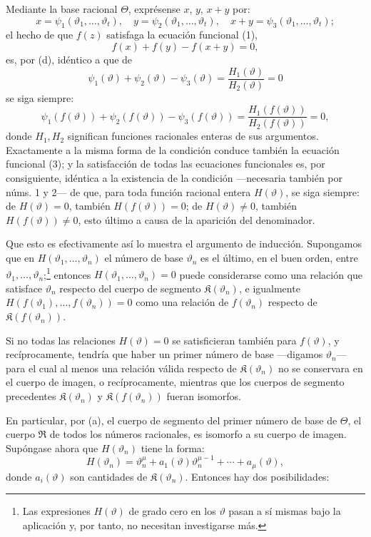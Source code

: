 \documentclass[11pt]{article}
\begin{document}
Mediante la base racional $\Theta$, exprésense $x$, $y$, $x+y$ por:
\[
x=\psi_1(\vartheta_1,\ldots,\vartheta_t),\quad
 y=\psi_2(\vartheta_1,\ldots,\vartheta_t),\quad
 x+y=\psi_3(\vartheta_1,\ldots,\vartheta_t);
\]
el hecho de que $f(z)$ satisfaga la ecuación funcional (1),
\[
f(x)+f(y)-f(x+y)=0,
\]
es, por (d), idéntico a que de
\[
\psi_1(\vartheta)+\psi_2(\vartheta)-\psi_3(\vartheta)=\frac{H_1(\vartheta)}{H_2(\vartheta)}=0
\]
se siga siempre:
\[
\psi_1(f(\vartheta))+\psi_2(f(\vartheta))-\psi_3(f(\vartheta))
=\frac{H_1(f(\vartheta))}{H_2(f(\vartheta))}=0,
\]
donde $H_1,H_2$ significan funciones racionales enteras de sus argumentos. Exactamente a la misma forma de la condición conduce también la ecuación funcional (3); y la satisfacción de todas las ecuaciones funcionales es, por consiguiente, idéntica a la existencia de la condición ---necesaria también por núms. 1 y 2--- de que, para toda función racional entera $H(\vartheta)$, se siga siempre: de $H(\vartheta)=0$, también $H(f(\vartheta))=0$; de $H(\vartheta)\ne0$, también $H(f(\vartheta))\ne0$, esto último a causa de la aparición del denominador.

Que esto es efectivamente así lo muestra el argumento de inducción. Supongamos que en $H(\vartheta_1,\ldots,\vartheta_n)$ el número de base $\vartheta_n$ es el último, en el buen orden, entre $\vartheta_1,\ldots,\vartheta_n$;\footnote{Las expresiones $H(\vartheta)$ de grado cero en los $\vartheta$ pasan a sí mismas bajo la aplicación y, por tanto, no necesitan investigarse más.} entonces $H(\vartheta_1,\ldots,\vartheta_n)=0$ puede considerarse como una relación que satisface $\vartheta_n$ respecto del cuerpo de segmento $\mathfrak K(\vartheta_n)$, e igualmente $H(f(\vartheta_1),\ldots,f(\vartheta_n))=0$ como una relación de $f(\vartheta_n)$ respecto de $\mathfrak K(f(\vartheta_n))$.

Si no todas las relaciones $H(\vartheta)=0$ se satisficieran también para $f(\vartheta)$, y recíprocamente, tendría que haber un primer número de base ---digamos $\vartheta_n$--- para el cual al menos una relación válida respecto de $\mathfrak K(\vartheta_n)$ no se conservara en el cuerpo de imagen, o recíprocamente, mientras que los cuerpos de segmento precedentes $\mathfrak K(\vartheta_n)$ y $\mathfrak K(f(\vartheta_n))$ fueran isomorfos.

En particular, por (a), el cuerpo de segmento del primer número de base de $\Theta$, el cuerpo $\mathfrak R$ de todos los números racionales, es isomorfo a su cuerpo de imagen. Supóngase ahora que $H(\vartheta_n)$ tiene la forma:
\[
H(\vartheta_n)=\vartheta_n^{\mu}+a_1(\vartheta)\vartheta_n^{\mu-1}+\cdots+a_\mu(\vartheta),
\]
donde $a_i(\vartheta)$ son cantidades de $\mathfrak K(\vartheta_n)$. Entonces hay dos posibilidades:
\end{document}
